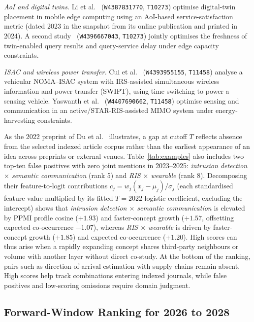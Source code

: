 \documentclass[runningheads]{llncs}
\begin{document}
\emph{AoI and digital twins.} Li et al.~\cite{li2024satisfaction} (\texttt{W4387831770}, \texttt{T10273}) optimise digital-twin placement in mobile edge computing using an AoI-based service-satisfaction metric (dated 2023 in the snapshot from its online publication and printed in 2024). A second study~\cite{li2024query} (\texttt{W4396667043}, \texttt{T10273}) jointly optimises the freshness of twin-enabled query results and query-service delay under edge capacity constraints.

\emph{ISAC and wireless power transfer.} Cui et al.~\cite{cui2024swipt} (\texttt{W4393955155}, \texttt{T11458}) analyse a vehicular NOMA--ISAC system with IRS-assisted simultaneous wireless information and power transfer (SWIPT), using time switching to power a sensing vehicle. Yaswanth et al.~\cite{yaswanth2025swipt} (\texttt{W4407690662}, \texttt{T11458}) optimise sensing and communication in an active/STAR-RIS-assisted MIMO system under energy-harvesting constraints.

As the 2022 preprint of Du et al.~\cite{du2023sensing} illustrates, a gap at cutoff $T$ reflects absence from the selected indexed article corpus rather than the earliest appearance of an idea across preprints or external venues. Table~\ref{tab:examples} also includes two top-ten false positives with zero joint mentions in 2023--2025: \emph{intrusion detection $\times$ semantic communication} (rank 5) and \emph{RIS $\times$ wearable} (rank 8). Decomposing their feature-to-logit contributions $c_j = w_j(x_j - \mu_j)/\sigma_j$ (each standardised feature value multiplied by its fitted $T{=}2022$ logistic coefficient, excluding the intercept) shows that \emph{intrusion detection $\times$ semantic communication} is elevated by PPMI profile cosine ($+1.93$) and faster-concept growth ($+1.57$, offsetting expected co-occurrence $-1.07$), whereas \emph{RIS $\times$ wearable} is driven by faster-concept growth ($+1.85$) and expected co-occurrence ($+1.20$). High scores can thus arise when a rapidly expanding concept shares third-party neighbours or volume with another layer without direct co-study. At the bottom of the ranking, pairs such as direction-of-arrival estimation with supply chains remain absent. High scores help track combinations entering indexed journals, while false positives and low-scoring omissions require domain judgment.

\subsection{Forward-Window Ranking for 2026 to 2028}
\end{document}
